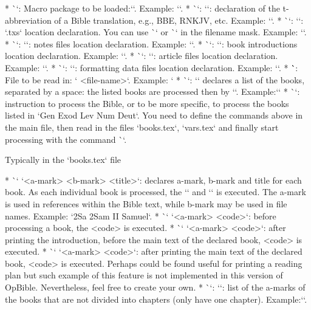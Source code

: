 {{\begitems
* \`\load`: Macro package to be loaded:``. Example: `\load [opbible]`.
* \`\tmark`: `\def\tmark{<t-abbreviation>}`: declaration of the t-abbreviation of a Bible 
translation, e.g., BBE, RNKJV, etc. 
   Example: `\def\tmark{BBE}`.
* \`\txsfile`: `\def\txsfile {<filename mask>}`: `.txs` location declaration. 
    You can use \`\amark` or \`\bmark` in the filename mask. 
    Example: `\def\txsfile {./txs/\tmark-\bmark.txs}`.
* \`\notesfile`: `\def\notesfile {<filename mask>}`:  notes files location declaration. 
Example: 
`\def\notesfile {./notes/notes-\amark.tex}`.
* \`\introfile`: `\def\introfile {<filename mask>}`:  book introductions location 
declaration. 
Example: `\def\introfile {./intros/intro-\amark.tex}`.
* \`\articlefile`: `\def\articlefile {<filename mask>}`: article files location declaration. 
   Example: `\def\articlefile {./articles/articles-\amark.tex}`.
* \`\fmtfile`: `\def\fmtfile {<filename mask>}`:  formatting data files location declaration. 
Example: `\def\fmtfile {./fmt/fmt-\tmark-\amark.tex}`.
* \``: File to be read in: ` {<file-name>}`. Example: `
* \`\printedbooks`: `\def\printedbooks {<list of a-marks>}` declares a list of the books, 
separated by a space:   the listed books are processed then by `\processbooks`. 
Example:\nl `\def\printedbooks {Gen Exod Lev Num Deut}`
* \`\processbooks`: instruction to process the Bible, or to be more  specific, to process the books 
listed in `\printedbooks`.
\enditems
You need to define the commands above in the main file, then
read in the files `books.tex`, `vars.tex` and finally start processing with the command
\`\processbooks`.

\secc Typically in the `books.tex` file

\begitems
* \`\BookTitle` `<a-mark> <b-mark> {<title>}`: declares  a-mark, b-mark and title for each book.
  As each individual book is processed, the  `\def\amark{<a-mark>}` and `\def\bmark{b-mark}` is 
  executed. 
  The a-mark is used in references within the Bible text, while  b-mark may be used in file names.
  Example: `\BookTitle 2Sa 2Sam {II Samuel}`.
* \`\BookException` `<a-mark> {<code>}`: before processing a book, the
  <code> is executed.
* \`\BookPre` `<a-mark> {<code>}`: after printing the introduction, before the main text of
  the declared book, <code> is executed.
* \`\BookPost` `<a-mark> {<code>}`: after printing the main text of the declared book, <code> is 
executed.
  Perhaps could be found useful for printing a reading plan but such example of this feature is not 
  implemented in this version of OpBible. 
  Nevertheless, feel free to create your own.
* \`\nochapbooks`: `\def\nochapbooks{<list>}`: list of the a-marks of the books that
  are not divided into chapters (only have one chapter). Example:\nl `\def\nochabooks {Obad Phlm 2John 3John Jude}`.
\enditems

}}
